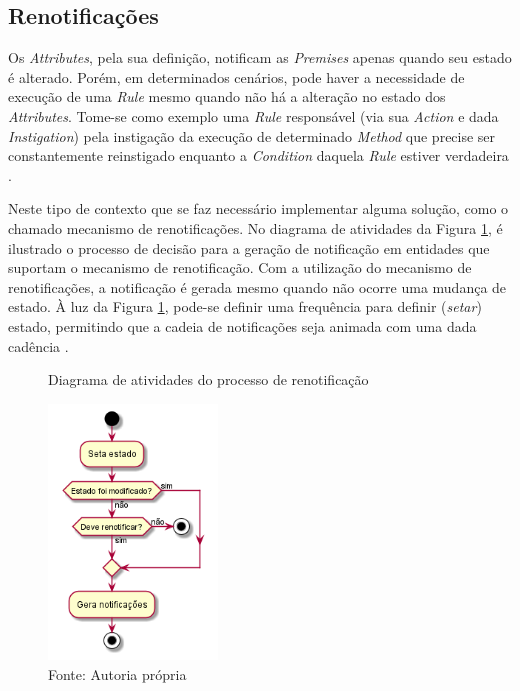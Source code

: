 \subsection{Renotificações}

Os \textit{Attributes}, pela sua definição, notificam as \textit{Premises}
apenas quando seu estado é alterado. Porém, em determinados cenários, pode haver
a necessidade de execução de uma \textit{Rule} mesmo quando não há a alteração
no estado dos \textit{Attributes}. Tome-se como exemplo uma \textit{Rule}
responsável (via sua \textit{Action} e dada \textit{Instigation}) pela
instigação da execução de determinado \textit{Method} que precise ser
constantemente reinstigado enquanto a \textit{Condition} daquela \textit{Rule}
estiver verdadeira \cite{msc_Banaszewski_2009}.

Neste tipo de contexto que se faz necessário implementar alguma solução, como o
chamado mecanismo de renotificações. No diagrama de atividades da Figura
\ref{fig:renotif_activity}, é ilustrado o processo de decisão para a geração de
notificação em entidades que suportam o mecanismo de renotificação. Com a
utilização do mecanismo de renotificações, a notificação é gerada mesmo quando
não ocorre uma mudança de estado. À luz da Figura \ref{fig:renotif_activity},
pode-se definir uma frequência para definir (\textit{setar}) estado, permitindo
que a cadeia de notificações seja animada com uma dada cadência
\cite{msc_Banaszewski_2009}.

\begin{figure}[!htb]
  \centering
  \caption{Diagrama de atividades do processo de renotificação}
  \includegraphics[width=0.4\textwidth]{../out/diagrams/renotification/renotif.png}
  \smallskip
  \caption*{Fonte: Autoria própria}
  \label{fig:renotif_activity}
\end{figure}

